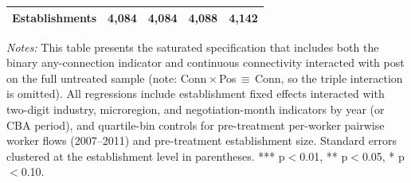 \documentclass[12pt,letterpaper]{article}
\begin{document}
\begin{table}[H]
\begin{threeparttable}
\begin{tabular}{lcccc}
Establishments & 4{,}084 & 4{,}084 & 4{,}088 & 4{,}142 \\
\bottomrule
\end{tabular}
\scriptsize
\begin{tablenotes}
\item \textit{Notes:} This table presents the saturated specification that includes both the binary any-connection indicator and continuous connectivity interacted with post on the full untreated sample (note: Conn\,$\times$\,Pos\,$\equiv$\,Conn, so the triple interaction is omitted). All regressions include establishment fixed effects interacted with two-digit industry, microregion, and negotiation-month indicators by year (or CBA period), and quartile-bin controls for pre-treatment per-worker pairwise worker flows (2007--2011) and pre-treatment establishment size. Standard errors clustered at the establishment level in parentheses. *** p$<$0.01, ** p$<$0.05, * p$<$0.10.
\end{tablenotes}
\end{threeparttable}
\end{table}

\clearpage
\end{document}
